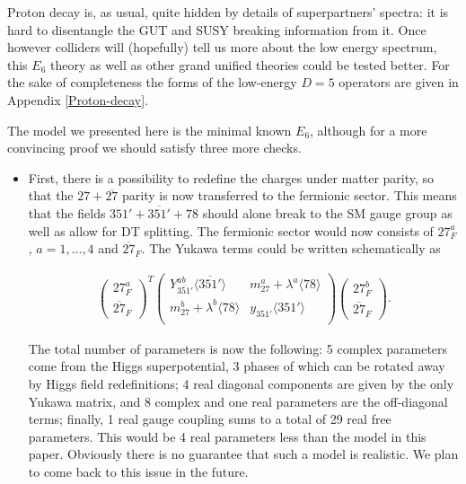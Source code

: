 \documentclass[a4paper,12pt]{article}
\begin{document}
Proton decay is, as usual, quite hidden by details of superpartners' spectra: it is hard to disentangle the
GUT and SUSY breaking information from it. Once however colliders will (hopefully) tell us more about the
low energy spectrum, this $E_6$ theory as well as other grand unified theories could be tested better.
For the sake of completeness the forms of the low-energy $D=5$ operators are given in Appendix
\ref{Proton-decay}.

The model we presented here is the minimal known $E_6$, although for a more convincing proof we should satisfy
three more checks.

\begin{itemize}

\item
First, there is a possibility to redefine the charges under matter parity, so that the $27+\overline{27}$ parity
is now transferred to the fermionic sector. This means that the fields $351'+\overline{351'}+78$ should
alone break to the SM gauge group as well as allow for DT splitting. The fermionic sector would now consists of
$27^a_F$, $a=1,\ldots,4$ and $\overline{27}_F$. The Yukawa terms could be written schematically as

    \begin{align}
    \begin{pmatrix} 27^{a}_F\\ \overline{27}_F\end{pmatrix}^T
    \begin{pmatrix}
     Y_{\overline{351'}}^{ab}\langle \overline{351'}\rangle &m_{27}^a+\lambda^a\langle 78\rangle\\
    m_{27}^b+\lambda^b\langle 78\rangle& y_{351'}\langle 351'\rangle\\
    \end{pmatrix}
    \begin{pmatrix} 27^{b}_F\\ \overline{27}_F\end{pmatrix}.
    \end{align}

The total number of parameters is now the following: 5 complex parameters come from the Higgs superpotential,
3 phases of which can be rotated away by Higgs field redefinitions; 4 real diagonal components are given by the
only Yukawa matrix, and 8 complex and one real parameters are the off-diagonal terms; finally, 1 real gauge
coupling sums to a total of 29 real free parameters. This would be 4 real parameters less than the model in this
paper. Obviously there is no guarantee that such a model is realistic. We plan to come back to this issue in
the future.


\end{itemize}
\end{document}
